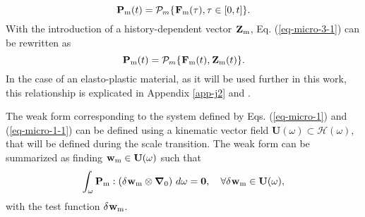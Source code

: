 \begin{equation}\label{eq-micro-3-1}
\tgmm[]{P}(t)=\mathcal{P}_m\{\tgmm[]{F}(\tau),\tau\in\left[0,t\right]\}.
\end{equation}
With the introduction of a history-dependent vector $ \tgmm[]{Z} $, Eq. (\ref{eq-micro-3-1}) can be rewritten as
\begin{equation}\label{eq-micro-3}
\tgmm[]{P}(t)=\mathcal{P}_m\{\tgmm[]{F}(t),\tgmm[]{Z}(t)\}.
\end{equation}
In the case of an elasto-plastic material, as it will be used further in this work, this relationship is explicated in Appendix \ref{app-j2} and  \cite{nguyenComputationalHomogenizationCellular2014}.

The weak form corresponding to the system defined by Eqs. (\ref{eq-micro-1}) and (\ref{eq-micro-1-1}) can be defined using a kinematic vector field $ \textbf{U}(\omega)\subset\mathcal{H}(\omega) $, that will be defined during the scale transition.
The weak form can be summarized as finding $ \tgmm{w}\in\textbf{U}(\omega) $ such that
\begin{equation}\label{eq-micro-5}
\int_\omega\tgmm{P}:\left(\delta\tgmm{w}\otimes\bm\nabla_0\right)\,d\omega=\bm{0},\quad\forall\delta\tgmm{w}\in\textbf{U}(\omega),
\end{equation}
with the test function $ \delta\tgmm{w} $.


